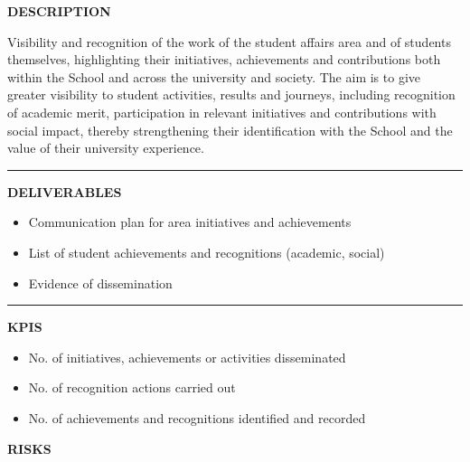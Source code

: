 \documentclass[11pt,a4paper]{scrreprt}
\newcommand{\fieldlabel}[1]{%
  {\footnotesize\sffamily\bfseries\color{mutedcolor}\MakeUppercase{#1}}\par\nopagebreak[4]
}
\newcommand{\fieldsep}{\vspace{3pt}\noindent\textcolor{bordercolor}{\rule{\linewidth}{0.4pt}}\vspace{3pt}\par}
\begin{document}
\begin{tcolorbox}[pabox={e360color}{A.P.4.1 \enspace\textbullet\enspace Showcasing and Recognising the Work of the Student Area and Students}]

\fieldlabel{Description}
{\small Visibility and recognition of the work of the student affairs area and of students themselves, highlighting their initiatives, achievements and contributions both within the School and across the university and society. The aim is to give greater visibility to student activities, results and journeys, including recognition of academic merit, participation in relevant initiatives and contributions with social impact, thereby strengthening their identification with the School and the value of their university experience. }\par
\fieldsep
\fieldlabel{Deliverables}
{\small \begin{itemize}[noitemsep,topsep=2pt]
\item Communication plan for area initiatives and achievements
\item List of student achievements and recognitions (academic, social)
\item Evidence of dissemination
\end{itemize}}\par
\fieldsep
\fieldlabel{KPIs}
{\small \begin{itemize}[noitemsep,topsep=2pt]
\item No. of initiatives, achievements or activities disseminated
\item No. of recognition actions carried out
\item No. of achievements and recognitions identified and recorded
\end{itemize}}\par
\end{tcolorbox}
\begin{tcolorbox}[riskbox]
{\footnotesize\sffamily\bfseries\color{red!50!black} RISKS}\par{}
\end{tcolorbox}
\end{document}
